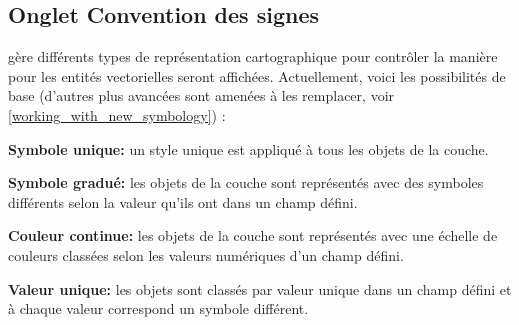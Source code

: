 \subsection{Onglet Convention des signes}\label{sec:symbology}

\qg gère différents types de représentation cartographique pour contrôler la manière pour les entités vectorielles seront affichées. Actuellement, voici les possibilités de base (d'autres plus avancées sont amenées à les remplacer, voir \ref{working_with_new_symbology}) :

\begin{description}
\item \textbf{Symbole unique:}   un style unique est appliqué à tous les objets de la couche.
\item \textbf{Symbole gradué:}  les objets de la couche sont représentés avec des symboles différents selon la valeur qu'ils ont dans un champ défini.
\item \textbf{Couleur continue:} les objets de la couche sont représentés avec une échelle de couleurs classées selon les valeurs numériques d'un champ défini.
\item \textbf{Valeur unique:}  les objets sont classés par valeur unique dans un champ défini et à chaque valeur correspond un symbole différent.
\end{description}

